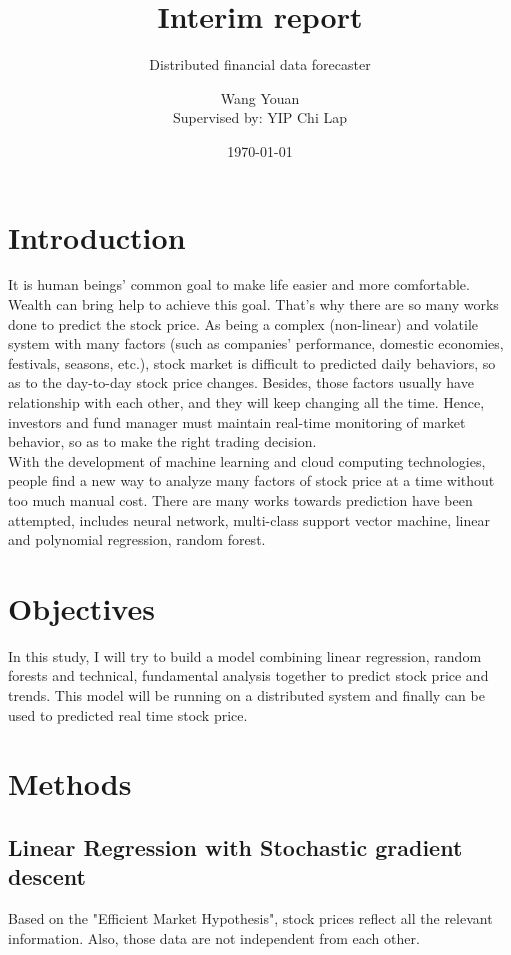 \documentclass[12pt,a4paper]{scrartcl}
\title{Interim report}
\subtitle{Distributed financial data forecaster}
\author{Wang Youan\\{\small Supervised by: YIP Chi Lap}}
\date{\today}
\begin{document}
	\maketitle
	\section{Introduction}
	It is human beings' common goal to make life easier and more comfortable. Wealth can bring help to achieve this goal. That's why there are so many works done to predict the stock price. As being a complex (non-linear) and volatile system with many factors (such as companies' performance, domestic economies, festivals, seasons, etc.)\cite{chen1986economic}, stock market is difficult to predicted daily behaviors, so as to the day-to-day stock price changes. Besides, those factors usually have relationship with each other, and they will keep changing all the time. Hence, investors and fund manager must maintain real-time monitoring of market behavior, so as to make the right trading decision.\\
	\indent With the development of machine learning and cloud computing technologies, people find a new way to analyze many factors of stock price at a time without too much manual cost. There are many works towards prediction have been attempted, includes neural network\cite{kimoto1990stock,naeini2010stock}, multi-class support vector machine\cite{kercheval2015modelling}, linear and polynomial regression\cite{nunnostock,alexanderstock}, random forest\cite{alexanderstock,lauretto2013evaluation}.
	\section{Objectives}
	In this study, I will try to build a model combining linear regression, random forests and technical, fundamental analysis together to predict stock price and trends. This model will be running on a distributed system and finally can be used to predicted real time stock price.
	\section{Methods}
	\subsection{Linear Regression with Stochastic gradient descent}
	Based on the "Efficient Market Hypothesis"\cite{basu1977investment}, stock prices reflect all the relevant information. Also, those data are not independent from each other.
\end{document}
